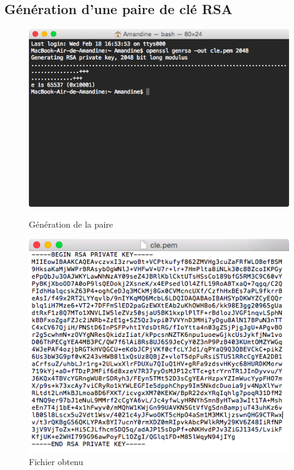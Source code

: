 \documentclass[11pt]{article}
\begin{document}
\subsection{Génération d'une paire de clé RSA}
\begin{figure}[hbtp]
    \begin{minipage}[b]{0.4\linewidth}
        \centering \includegraphics[scale=0.4]{q21.png}
        \caption{Génération de la paire}
                \label{fig:gen}
\label{fig:base}
    \end{minipage}\hfill
    \begin{minipage}[b]{0.48\linewidth}
        \centering \includegraphics[scale=0.4]{q21b.png}
        \caption{Fichier obtenu}
         \label{fig:cle}
    \end{minipage}
\end{figure}
\end{document}
